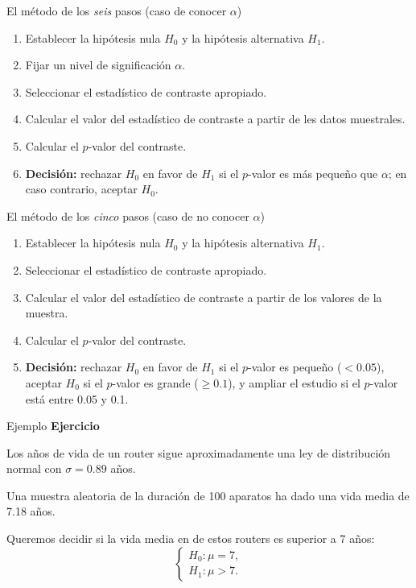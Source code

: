 \documentclass[
  ignorenonframetext,
]{beamer}
\begin{document}
\begin{frame}{El método de los \emph{seis} pasos (caso de conocer
\(\alpha\))}
\protect\hypertarget{el-muxe9todo-de-los-seis-pasos-caso-de-conocer-alpha}{}
\begin{enumerate}[<+->]
[1)]
\item
  Establecer la hipótesis nula \(H_0\) y la hipótesis alternativa
  \(H_1\).
\item
  Fijar un nivel de significación \(\alpha\).
\item
  Seleccionar el estadístico de contraste apropiado.
\item
  Calcular el valor del estadístico de contraste a partir de les datos
  muestrales.
\item
  Calcular el \(p\)-valor del contraste.
\item
  \textbf{Decisión:} rechazar \(H_0\) en favor de \(H_1\) si el
  \(p\)-valor es más pequeño que \(\alpha\); en caso contrario, aceptar
  \(H_0\).
\end{enumerate}
\end{frame}

\begin{frame}{El método de los \emph{cinco} pasos (caso de no conocer
\(\alpha\))}
\protect\hypertarget{el-muxe9todo-de-los-cinco-pasos-caso-de-no-conocer-alpha}{}
\begin{enumerate}[<+->]
[1)]
\item
  Establecer la hipótesis nula \(H_0\) y la hipótesis alternativa
  \(H_1\).
\item
  Seleccionar el estadístico de contraste apropiado.
\item
  Calcular el valor del estadístico de contraste a partir de los valores
  de la muestra.
\item
  Calcular el \(p\)-valor del contraste.
\item
  \textbf{Decisión:} rechazar \(H_0\) en favor de \(H_1\) si el
  \(p\)-valor es pequeño (\(<0.05\)), aceptar \(H_0\) si el \(p\)-valor
  es grande (\(\geq 0.1\)), y ampliar el estudio si el \(p\)-valor está
  entre 0.05 y 0.1.
\end{enumerate}
\end{frame}

\begin{frame}{Ejemplo}
\protect\hypertarget{ejemplo-4}{}
\textbf{Ejercicio}

Los años de vida de un router sigue aproximadamente una ley de
distribución normal con \(\sigma=0.89\) años.

Una muestra aleatoria de la duración de 100 aparatos ha dado una vida
media de 7.18 años.

Queremos decidir si la vida media en de estos routers es superior a 7
años: \[
\left\{\begin{array}{l}
H_0:\mu=7,\\ 
H_1:\mu>7.
\end{array}
\right.
\]
\end{frame}
\end{document}
